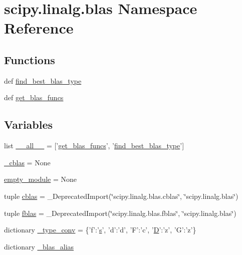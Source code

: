 \hypertarget{namespacescipy_1_1linalg_1_1blas}{}\section{scipy.\+linalg.\+blas Namespace Reference}
\label{namespacescipy_1_1linalg_1_1blas}
\subsection*{Functions}
\begin{DoxyCompactItemize}
\item 
def \hyperlink{namespacescipy_1_1linalg_1_1blas_af00eb0abdb44c4e644e3f78f7735f309}{find\+\_\+best\+\_\+blas\+\_\+type}
\item 
def \hyperlink{namespacescipy_1_1linalg_1_1blas_a34d4260a4c678a5462e07498985965ae}{get\+\_\+blas\+\_\+funcs}
\end{DoxyCompactItemize}
\subsection*{Variables}
\begin{DoxyCompactItemize}
\item 
list \hyperlink{namespacescipy_1_1linalg_1_1blas_a0dcbeb3cf5c3d21a477265e62a1c347c}{\+\_\+\+\_\+all\+\_\+\+\_\+} = \mbox{[}'\hyperlink{namespacescipy_1_1linalg_1_1blas_a34d4260a4c678a5462e07498985965ae}{get\+\_\+blas\+\_\+funcs}', '\hyperlink{namespacescipy_1_1linalg_1_1blas_af00eb0abdb44c4e644e3f78f7735f309}{find\+\_\+best\+\_\+blas\+\_\+type}'\mbox{]}
\item 
\hyperlink{namespacescipy_1_1linalg_1_1blas_a1390450de1aa42a0d5d1d18a8ff0b687}{\+\_\+cblas} = None
\item 
\hyperlink{namespacescipy_1_1linalg_1_1blas_af295f7ae5b5c08cff5238042afd70854}{empty\+\_\+module} = None
\item 
tuple \hyperlink{namespacescipy_1_1linalg_1_1blas_a34c674579eda86cd0f9086f41cc0577e}{cblas} = \+\_\+\+Deprecated\+Import(\char`\"{}scipy.\+linalg.\+blas.\+cblas\char`\"{}, \char`\"{}scipy.\+linalg.\+blas\char`\"{})
\item 
tuple \hyperlink{namespacescipy_1_1linalg_1_1blas_a4bd01d83ab6c5f6b63727c7d14a86a69}{fblas} = \+\_\+\+Deprecated\+Import(\char`\"{}scipy.\+linalg.\+blas.\+fblas\char`\"{}, \char`\"{}scipy.\+linalg.\+blas\char`\"{})
\item 
dictionary \hyperlink{namespacescipy_1_1linalg_1_1blas_ab328cec4e8cdff29330faa8f2b135cbe}{\+\_\+type\+\_\+conv} = \{'f'\+:'\hyperlink{indexexpr_8h_ae024b0db549122b44c349ae28ec990dc}{s}', 'd'\+:'d', 'F'\+:'c', '\hyperlink{odrpack_8h_a7dae6ea403d00f3687f24a874e67d139}{D}'\+:'z', 'G'\+:'z'\}
\item 
dictionary \hyperlink{namespacescipy_1_1linalg_1_1blas_a86f2b236405f2917ec9382e6178a285d}{\+\_\+blas\+\_\+alias}
\end{DoxyCompactItemize}


